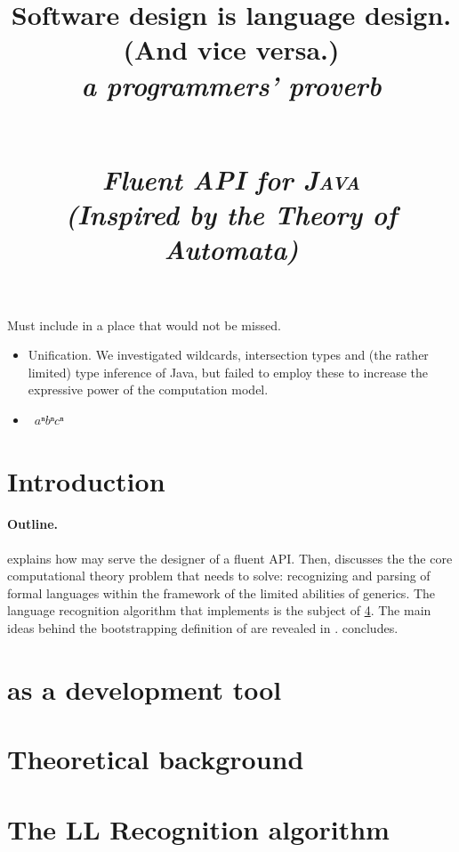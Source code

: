 \documentclass[nonatbib,preprint,numbers]{sigplanconf}
\title{%
\begin{flushright}
  \scriptsize\bfseries
  Software design is language design. \\
    (And vice versa.) \\
  \footnotesize\mdseries\itshape
   a programmers' proverb
\end{flushright}
  \Huge \Fajita \\ 
  \huge \itshape \textbf Fluent \textbf API for \textsc{\textbf Java} \\
  \LARGE (\textbf Inspired by the \textbf Theory of \textbf Automata)
}
\begin{document}
\maketitle

\begin{abstract}
  
\end{abstract}

Must include in a place that would not be missed.
\begin{itemize}
  \item \Prolog Unification.  We investigated wildcards, intersection types and
        (the rather limited) type inference of Java, but failed to employ these to
        increase the expressive power of the computation model.
        \item~$aⁿbⁿcⁿ$
\end{itemize}

\section{Introduction}


\paragraph{Outline.} 
  explains how \Fajita may serve the designer of a fluent API. 
Then,  discusses the 
  the core computational theory problem that \Fajita 
  needs to solve: recognizing and parsing of formal languages
  within the framework of the limited abilities of \Java
  generics.
The language recognition algorithm that \Fajita
  implements is the subject of \cref{Section:recognizer}.
The main ideas behind the bootstrapping definition of \Self 
  are revealed in . 
 concludes. 




\section{\Fajita as a development tool}
\label{Section:proposal}


\section{Theoretical background}
\label{Section:theoretical-background}


\section{The LL Recognition algorithm}
\label{Section:recognizer}

\end{document}
